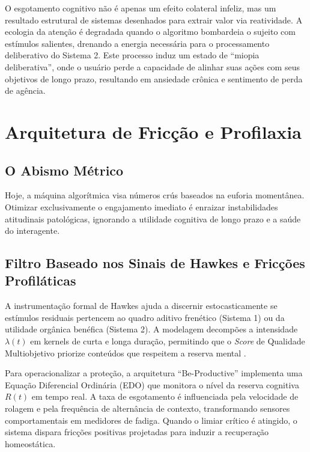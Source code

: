 \documentclass[12pt, a4paper]{article}
\begin{document}
O esgotamento cognitivo não é apenas um efeito colateral infeliz, mas um resultado estrutural de sistemas desenhados para extrair valor via reatividade. A ecologia da atenção \citep{citton2017} é degradada quando o algoritmo bombardeia o sujeito com estímulos salientes, drenando a energia necessária para o processamento deliberativo do Sistema 2. Este processo induz um estado de ``miopia deliberativa'', onde o usuário perde a capacidade de alinhar suas ações com seus objetivos de longo prazo, resultando em ansiedade crônica e sentimento de perda de agência.

\section{Arquitetura de Fricção e Profilaxia}

\subsection{O Abismo Métrico}

Hoje, a máquina algorítmica visa números crús baseados na euforia momentânea. Otimizar exclusivamente o engajamento imediato é enraizar instabilidades atitudinais patológicas, ignorando a utilidade cognitiva de longo prazo e a saúde do interagente.

\subsection{Filtro Baseado nos Sinais de Hawkes e Fricções Profiláticas}

A instrumentação formal de Hawkes ajuda a discernir estocasticamente se estímulos residuais pertencem ao quadro aditivo frenético (Sistema 1) ou da utilidade orgânica benéfica (Sistema 2). A modelagem decompões a intensidade $\lambda(t)$ em kernels de curta e longa duração, permitindo que o \textit{Score} de Qualidade Multiobjetivo priorize conteúdos que respeitem a reserva mental \citep{stray2021}.

Para operacionalizar a proteção, a arquitetura ``Be-Productive'' implementa uma Equação Diferencial Ordinária (EDO) que monitora o nível da reserva cognitiva $R(t)$ em tempo real. A taxa de esgotamento é influenciada pela velocidade de rolagem e pela frequência de alternância de contexto, transformando sensores comportamentais em medidores de fadiga. Quando o limiar crítico é atingido, o sistema dispara fricções positivas projetadas para induzir a recuperação homeostática.
\end{document}
